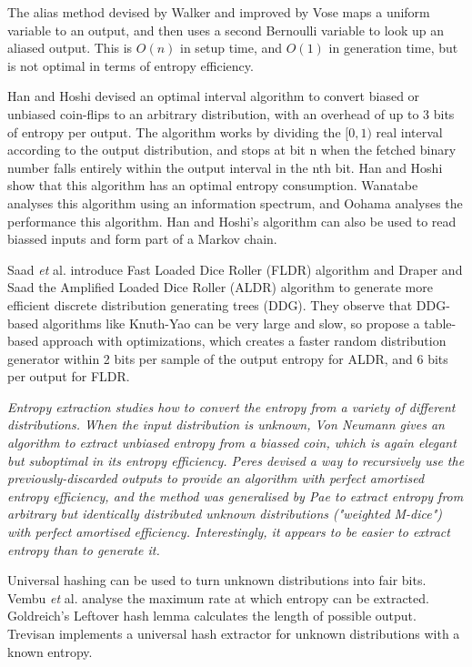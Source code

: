 \documentclass[12pt]{article}
\begin{document}
The alias method devised by Walker \cite{walker1977efficient} and improved by Vose \cite{vose91} maps a uniform variable to an output, and then uses a second Bernoulli variable to look up an aliased output. This is $O(n)$ in setup time, and $O(1)$ in generation time, but is not optimal in terms of entropy efficiency.

Han and Hoshi \cite{han97} devised an optimal interval algorithm to convert biased or unbiased coin-flips to an arbitrary distribution, with an overhead of up to 3 bits of entropy per output.  The algorithm works by dividing the $[0,1)$ real interval according to the output distribution, and stops at bit n when the fetched binary number falls entirely within the output interval in the nth bit. Han and Hoshi show that this algorithm has an optimal entropy consumption. 
Wanatabe \cite{wanatabe20} analyses this algorithm using an information spectrum, and Oohama \cite{oohama11, oohama2020performance} analyses the performance this algorithm. Han and Hoshi's algorithm can also be used to read biassed inputs and form part of a Markov chain.

Saad \emph{et} al. \cite{saad2020fldr} introduce Fast Loaded Dice Roller (FLDR) algorithm and Draper and Saad \cite{draper2025efficient} the Amplified Loaded Dice Roller (ALDR) algorithm to generate more efficient discrete distribution generating trees (DDG). They observe that DDG-based algorithms like Knuth-Yao can be very large and slow, so propose a table-based approach with optimizations, which creates a faster random distribution generator within 2 bits per sample of the output entropy for ALDR, and 6 bits per output for FLDR.

\em Entropy extraction \em studies how to convert the entropy \em from \em a variety of different distributions. When the input distribution is unknown, Von Neumann \cite{neumann51} gives an algorithm to extract unbiased entropy from a biassed coin, which is again elegant but suboptimal in its entropy efficiency. Peres \cite{peres1992iterating} devised a way to recursively use the previously-discarded outputs to provide an algorithm with perfect amortised entropy efficiency, and the method was generalised by Pae \cite{pae15} to extract entropy from arbitrary but identically distributed unknown distributions ("weighted M-dice") with perfect amortised efficiency. Interestingly, it appears to be easier to extract entropy than to generate it.

Universal hashing can be used to turn unknown distributions into fair bits. Vembu \emph{et} al. \cite{vembu95} analyse the maximum rate at which entropy can be extracted. Goldreich's Leftover hash lemma \cite{goldreich2004foundations} calculates the length of possible output. Trevisan \cite{trevisan2001extractors} implements a universal hash extractor for unknown distributions with a known entropy. 
\end{document}
